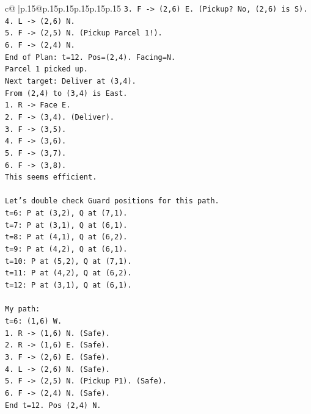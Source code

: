 \documentclass{article}
\begin{document}
{\begin{supertabular}{c@{$\;$}|p{.15\linewidth}@{}p{.15\linewidth}p{.15\linewidth}p{.15\linewidth}p{.15\linewidth}p{.15\linewidth}}
{{{\texttt{3. F {-}> (2,6) E. (Pickup? No, (2,6) is S).} \\
\texttt{4. L {-}> (2,6) N.} \\
\texttt{5. F {-}> (2,5) N. (Pickup Parcel 1!).} \\
\texttt{6. F {-}> (2,4) N.} \\
\texttt{End of Plan: t=12. Pos=(2,4). Facing=N.} \\
\texttt{Parcel 1 picked up.} \\
\texttt{Next target: Deliver at (3,4).} \\
\texttt{From (2,4) to (3,4) is East.} \\
\texttt{1. R {-}> Face E.} \\
\texttt{2. F {-}> (3,4). (Deliver).} \\
\texttt{3. F {-}> (3,5).} \\
\texttt{4. F {-}> (3,6).} \\
\texttt{5. F {-}> (3,7).} \\
\texttt{6. F {-}> (3,8).} \\
\texttt{This seems efficient.} \\
\\ 
\texttt{Let's double check Guard positions for this path.} \\
\texttt{t=6: P at (3,2), Q at (7,1).} \\
\texttt{t=7: P at (3,1), Q at (6,1).} \\
\texttt{t=8: P at (4,1), Q at (6,2).} \\
\texttt{t=9: P at (4,2), Q at (6,1).} \\
\texttt{t=10: P at (5,2), Q at (7,1).} \\
\texttt{t=11: P at (4,2), Q at (6,2).} \\
\texttt{t=12: P at (3,1), Q at (6,1).} \\
\\ 
\texttt{My path:} \\
\texttt{t=6: (1,6) W.} \\
\texttt{1. R {-}> (1,6) N. (Safe).} \\
\texttt{2. R {-}> (1,6) E. (Safe).} \\
\texttt{3. F {-}> (2,6) E. (Safe).} \\
\texttt{4. L {-}> (2,6) N. (Safe).} \\
\texttt{5. F {-}> (2,5) N. (Pickup P1). (Safe).} \\
\texttt{6. F {-}> (2,4) N. (Safe).} \\
\texttt{End t=12. Pos (2,4) N.} \\
}}}
\end{supertabular}}
\end{document}
